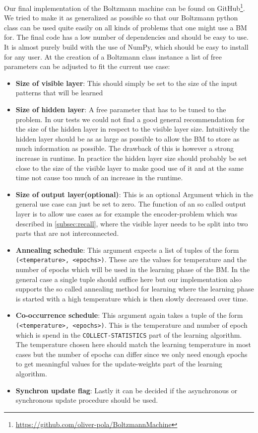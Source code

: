 \documentclass[12pt,twoside]{article}
\theoremstyle{plain}
\theoremstyle{definition}
\theoremstyle{remark}
\begin{document}
Our final implementation of the Boltzmann machine can be found on GitHub\footnote{\url{https://github.com/oliver-pola/BoltzmannMachine}}. We tried to make it as generalized as possible
so that our Boltzmann python class can be used quite easily on all kinds of problems that one might use a BM for. The final code has a low number of dependencies and should be
easy to use. It is almost purely build with the use of NumPy, which should be easy to install for any user.
At the creation of a Boltzmann class instance a list of free parameters can be adjusted to fit the current use case:
\begin{itemize}
    \item \textbf{Size of visible layer}: This should simply be set to the size of the input patterns that will be learned
    \item \textbf{Size of hidden layer}: A free parameter that
        has to be tuned to the problem. In our tests we could
        not find a good general recommendation for the size
        of the hidden layer in respect to the visible layer size.
        Intuitively the hidden layer should be as as large as possible to allow 
        the BM to store as much information as possible. The drawback of this is however
        a strong increase in runtime. In practice the hidden layer size should 
        probably be set close to the size of the visible layer to make good use of it and
        at the same time not cause too much of an increase in the runtime.

    \item \textbf{Size of output layer(optional)}: This is an optional
        Argument which in the general use case can just be set to zero.
        The function of an so called output layer is to allow use cases as
        for example the encoder-problem which was described in \cref{subsec:recall}, where
        the visible layer needs to be split into two parts that are not interconnected.
    \item \textbf{Annealing schedule}: This argument expects a list of tuples of the form
        \lstinline{(<temperature>, <epochs>)}. These are the values for temperature and the
        number of epochs which will be used in the learning phase of the BM.
        In the general case a single tuple should suffice here but our implementation also
        supports the so called annealing method for learning where the learning phase
        is started with a high temperature which is then slowly decreased over time.
    \item \textbf{Co-occurrence schedule}: This argument again takes a tuple of the form
        \lstinline{(<temperature>, <epochs>)}. This is the temperature and number of
        epoch which is spend in the \lstinline{COLLECT-STATISTICS} part of the
        learning algorithm. The temperature chosen here should match the learning
        temperature in most cases but the number of epochs can differ since we
        only need enough epochs to get meaningful values for the update-weights
        part of the learning algorithm.
    \item \textbf{Synchron update flag}: Lastly it can be decided if the asynchronous or
        synchronous update procedure should be used.
\end{itemize}
\end{document}
